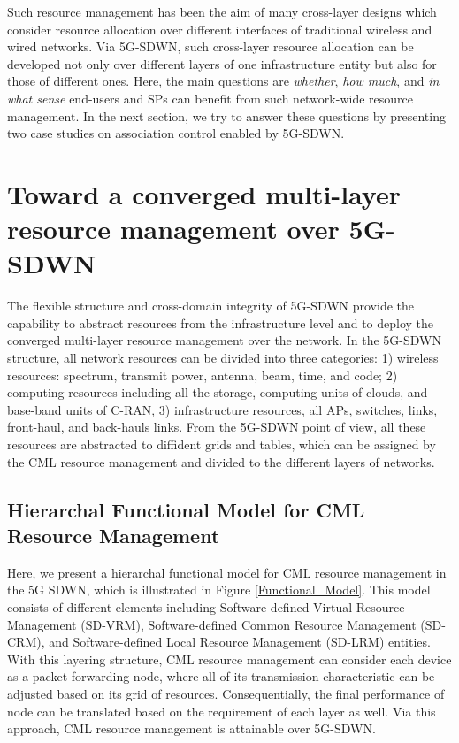 \documentclass[conference]{IEEEtran}
\begin{document}
Such resource management has been the aim of many cross-layer designs which consider resource allocation over different interfaces of traditional wireless and wired networks. Via 5G-SDWN, such cross-layer resource allocation can be developed not only over different layers of one infrastructure entity but also for those of different ones. 
Here, the main questions are \textit{whether}, \textit{how much}, and \textit{in what sense} end-users and SPs can benefit from such network-wide resource management. In the next section, we try to answer these questions by presenting two case studies on association control enabled by 5G-SDWN.



\section{Toward a converged multi-layer resource management over 5G-SDWN}

The flexible structure and cross-domain integrity of 5G-SDWN provide the capability to abstract resources from the infrastructure level and to deploy the converged multi-layer resource management over the network. In the 5G-SDWN structure, all network resources can be divided into three categories: 1) wireless resources: spectrum, transmit power, antenna, beam, time, and code; 2) computing resources including all the storage, computing units of clouds, and base-band units of C-RAN, 3) infrastructure resources, all APs, switches, links, front-haul, and back-hauls links. From the 5G-SDWN point of view, all these resources are abstracted to diffident grids and tables, which can be assigned by the CML resource management and divided to the different layers of networks. 

\subsection{Hierarchal Functional Model for CML Resource Management}

Here, we present a hierarchal functional model for CML resource management in the 5G SDWN, which is illustrated in Figure \ref{Functional_Model}. 
This model consists of different elements including Software-defined Virtual Resource Management (SD-VRM), Software-defined Common Resource Management (SD-CRM), and Software-defined Local Resource Management (SD-LRM) entities. With this layering structure, CML resource management can consider each device as a packet forwarding node, where all of its transmission characteristic can be adjusted based on its grid of resources. Consequentially, the final performance of node can be translated based on the requirement of each layer as well. Via this approach, CML resource management is attainable over 5G-SDWN.  
\end{document}
